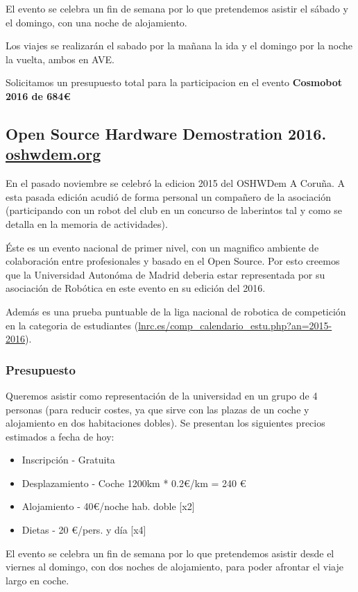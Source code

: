 \documentclass[12pt,twoside]{report}
\begin{document}
El evento se celebra un fin de semana por lo que pretendemos asistir el sábado y el domingo, con una noche de alojamiento.

Los viajes se realizarán el sabado por la mañana la ida y el domingo por la noche la vuelta, ambos en AVE.

Solicitamos un presupuesto total para la participacion en el evento {\bf Cosmobot 2016 de 684\euro{}}

\subsection{Open Source Hardware Demostration 2016. \url{oshwdem.org}}
En el pasado noviembre se celebró la edicion 2015 del OSHWDem A Coruña. A esta pasada edición acudió de forma personal un compañero de la asociación (participando con un robot del club en un concurso de laberintos tal y como se detalla en la memoria de actividades).

Éste es un evento nacional de primer nivel, con un magnifico ambiente de colaboración entre profesionales y basado en el Open Source. Por esto creemos que la Universidad Autonóma de Madrid deberia estar representada por su asociación de Robótica en este evento en su edición del 2016.

Además es una prueba puntuable de la liga nacional de robotica de competición en la categoria de estudiantes (\url{lnrc.es/comp_calendario_estu.php?an=2015-2016}).

\subsubsection{Presupuesto}
Queremos asistir como representación de la universidad en un grupo de 4 personas (para reducir costes, ya que sirve con las plazas de un coche y alojamiento en dos habitaciones dobles). Se presentan los siguientes precios estimados a fecha de hoy:
\begin{itemize}
\item Inscripción - Gratuita
\item Desplazamiento - Coche 1200km * 0.2\euro{}/km = 240 \euro{}
\item Alojamiento - 40\euro{}/noche hab. doble [x2]
\item Dietas - 20 \euro{}/pers. y día [x4]
\end{itemize}
El evento se celebra un fin de semana por lo que pretendemos asistir desde el viernes al domingo, con dos noches de alojamiento, para poder afrontar el viaje largo en coche.
\end{document}
